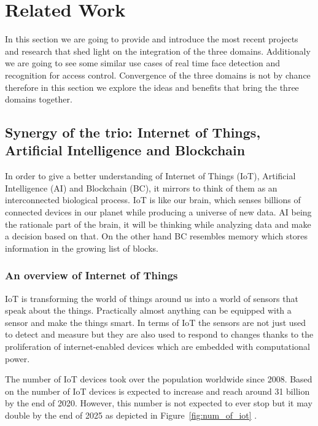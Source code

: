 \chapter{Related Work}
\label{chap:related_work}

In this section we are going to provide and introduce the most recent projects and research that shed light on the integration of the three domains. Additionaly we are going to see some similar use cases of real time face detection and recognition for access control. Convergence of the three domains is not by chance therefore in this section we explore the ideas and benefits that bring the three domains together. 

\section{Synergy of the trio: Internet of Things, Artificial Intelligence and Blockchain }

In order to give a better understanding of Internet of Things (IoT), Artificial Intelligence (AI) and Blockchain (BC), it mirrors to think of them as an interconnected biological process. IoT is like our brain, which senses billions of connected devices in our planet while producing a universe of new data. AI being the rationale part of the brain, it will be thinking while analyzing data and make a decision based on that. On the other hand BC resembles memory which stores information in the growing list of blocks.
\subsection{An overview of Internet of Things}

IoT is transforming the world of things around us into a world of sensors that speak about the things. Practically almost anything can be equipped with a sensor and make the things smart. In terms of IoT the sensors are not just used to detect and measure but they are also used to respond to changes thanks to the proliferation of internet-enabled devices which are embedded with computational power. 

The number of IoT devices took over the population worldwide since 2008. Based on \cite{ITU} the number of IoT devices is expected to increase and reach around 31 billion by the end of 2020. However, this number is not expected to ever stop but it may double by the end of 2025 \cite{soton421529} as depicted in Figure~\ref{fig:num_of_iot} .

